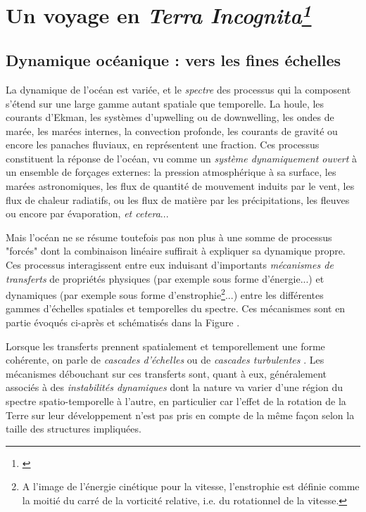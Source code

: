 \section[Un voyage en \textit{Terra Incognita}]{Un voyage en \textit{Terra Incognita\footnote{\cite{scotti_large_2010}}}}
\subsection{Dynamique océanique : vers les fines échelles}
\label{subsection_intro1}

La dynamique de l'océan est variée, et le \textit{spectre} des processus qui la composent s'étend sur une large gamme autant spatiale que temporelle. La houle, les courants d'Ekman, les systèmes d'upwelling ou de downwelling, les ondes de marée, les marées internes, la convection profonde, les courants de gravité ou encore les panaches fluviaux, en représentent une fraction. Ces processus constituent la réponse de l'océan, vu comme un \textit{système dynamiquement ouvert} à un ensemble de forçages externes: la pression atmosphérique à sa surface, les marées astronomiques, les flux de quantité de mouvement induits par le vent, les flux de chaleur radiatifs, ou les flux de matière par les précipitations, les fleuves ou encore par évaporation, \textit{et cetera}...

Mais l'océan ne se résume toutefois pas non plus à une somme de processus "forcés" dont la combinaison linéaire suffirait à expliquer sa dynamique propre. Ces processus interagissent  entre eux induisant d'importants \textit {mécanismes de transferts} de propriétés physiques (par exemple sous forme d'énergie...) et dynamiques (par exemple sous forme d'enstrophie\footnote{A l'image de l'énergie cinétique pour la vitesse, l'enstrophie est définie comme la moitié du carré de la vorticité relative, i.e. du rotationnel de la vitesse.}...) entre les différentes gammes d'échelles spatiales et temporelles du spectre. Ces mécanismes sont en partie évoqués ci-après et schématisés dans la Figure . 

Lorsque les transferts prennent spatialement et temporellement une forme cohérente, on parle de \textit{cascades d'échelles} ou de \textit{cascades turbulentes} \citep{lapeyre_topologie_2000}. Les mécanismes débouchant sur ces transferts sont, quant à eux, généralement associés à des \textit{instabilités dynamiques} dont la nature va varier d'une région du spectre spatio-temporelle à l'autre, en particulier car l'effet de la rotation de la Terre sur leur développement n'est pas pris en compte de la même façon selon la taille des structures impliquées.


